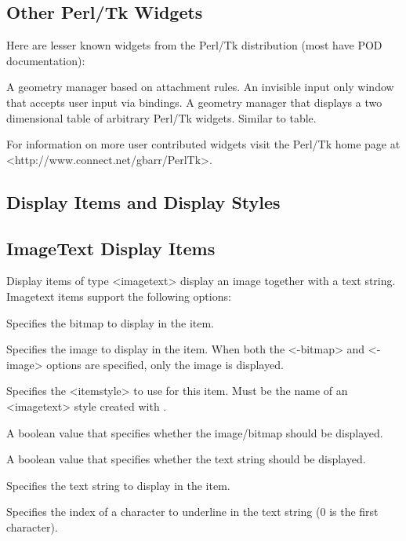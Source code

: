 \subsection*{Other Perl/Tk Widgets}
\vspace{-4pt}
Here are  lesser known widgets from the Perl/Tk distribution (most have POD documentation):
\vskip5pt

\begin{enum}{1cm}
A geometry manager based on attachment rules.
An invisible input only window that accepts user input via bindings.
A geometry manager that displays a two dimensional table of arbitrary Perl/Tk widgets.
Similar to table.
\end{enum} 

For information on more user contributed widgets visit the Perl/Tk home page at
<http://www.connect.net/gbarr/PerlTk>.

\subsection*{Display Items and Display Styles}

\subsection*{ImageText Display Items}
Display items of type <imagetext> display an image
together with a text string. Imagetext items support the following options:
\begin{enum}{1cm}
Specifies the bitmap to display in the item.

Specifies the image to display in the item. When both the
<-bitmap> and <-image> options are specified, only the image
is displayed.

Specifies the <itemstyle> to use for this item. Must be the
name of an <imagetext> style created with
.

A boolean value that specifies whether the image/bitmap should be
displayed.

A boolean value that specifies whether the text string should be
displayed.

Specifies the text string to display in the item.

Specifies the index of a character to underline in the text
string (0 is the first character).
\end{enum}

